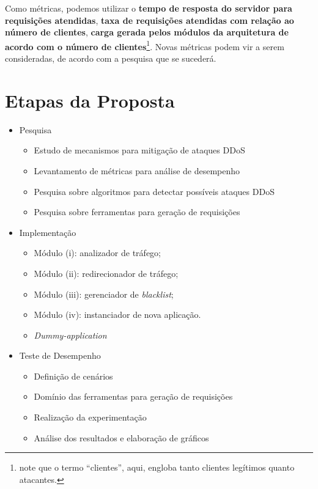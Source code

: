 \documentclass[a4paper, 11pt]{article}
\begin{document}
Como métricas, podemos utilizar o \textbf{tempo de resposta do servidor para requisições atendidas}, \textbf{taxa de requisições atendidas com relação ao número de clientes}, \textbf{carga gerada pelos módulos da arquitetura de acordo com o número de clientes}\footnote{note que o termo ``clientes'', aqui, engloba tanto clientes legítimos quanto atacantes.}. Novas métricas podem vir a serem consideradas, de acordo com a pesquisa que se sucederá.

\section{Etapas da Proposta}
\begin{itemize}
 \item Pesquisa
  \begin{itemize}
    \item Estudo de mecanismos para mitiga\c{c}\~{a}o de ataques DDoS
	\item Levantamento de métricas para análise de desempenho
	\item Pesquisa sobre algoritmos para detectar possíveis ataques DDoS
	\item Pesquisa sobre ferramentas para geração de requisições
  \end{itemize}

 \item Implementa\c{c}\~{a}o
  \begin{itemize}
      \item Módulo (i): analizador de tráfego;
	  \item Módulo (ii): redirecionador de tráfego;
	  \item Módulo (iii): gerenciador de \emph{blacklist};
	  \item Módulo (iv): instanciador de nova aplica\c{c}\~{a}o.
	  \item \emph{Dummy-application}
  \end{itemize}

 \item Teste de Desempenho 
  \begin{itemize}
    \item Definição de cenários
	\item Domínio das ferramentas para geração de requisições
	\item Realização da experimentação
	\item Análise dos resultados e elaboração de gráficos
  \end{itemize}
\end{itemize}




\end{document}

